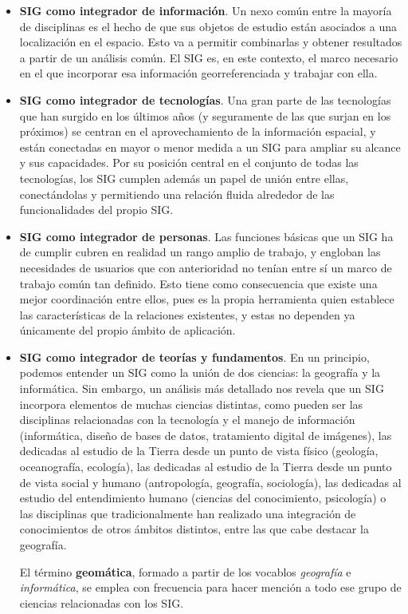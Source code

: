 \begin{itemize}
\item \textbf{SIG como integrador de información}. Un nexo común entre la mayoría de disciplinas es el hecho de que sus objetos de estudio están asociados a una localización en el espacio. Esto va a permitir combinarlas y obtener resultados a partir de un análisis común. El SIG es, en este contexto, el marco necesario en el que incorporar esa información georreferenciada y trabajar con ella.

\item \textbf{SIG como integrador de tecnologías}. Una gran parte de las tecnologías que han surgido en los últimos años (y seguramente de las que surjan en los próximos) se centran en el aprovechamiento de la información espacial, y están conectadas en mayor o menor medida a un SIG para ampliar su alcance y sus capacidades. Por su posición central en el conjunto de todas las tecnologías, los SIG cumplen además un papel de unión entre ellas, conectándolas y permitiendo una relación fluida alrededor de las funcionalidades del propio SIG.

\item \textbf{SIG como integrador de personas}. Las funciones básicas que un SIG ha de cumplir cubren en realidad un rango amplio de trabajo, y engloban las necesidades de usuarios que con anterioridad no tenían entre sí un marco de trabajo común tan definido. Esto tiene como consecuencia que existe una mejor coordinación entre ellos, pues es la propia herramienta quien establece las características de la relaciones existentes, y estas no dependen ya únicamente del propio ámbito de aplicación.

\item \textbf{SIG como integrador de teorías y fundamentos}. En un principio, podemos entender un SIG como la unión de dos ciencias: la geografía y la informática. Sin embargo, un análisis más detallado nos revela que un SIG incorpora elementos de muchas ciencias distintas, como pueden ser las disciplinas relacionadas con la tecnología y el manejo de información (informática, diseño de bases de datos, tratamiento digital de imágenes), las dedicadas al estudio de la Tierra desde un punto de vista físico (geología,  oceanografía, ecología), las dedicadas al estudio de la Tierra desde un punto de vista social y humano (antropología, geografía, sociología), las dedicadas al estudio del entendimiento humano (ciencias del conocimiento, psicología) o las disciplinas que tradicionalmente han realizado una integración de conocimientos de otros ámbitos distintos, entre las que cabe destacar la geografía.

El término \textbf{geomática}, formado a partir de los vocablos \emph{geografía} e \emph{informática}, se emplea con frecuencia para hacer mención a todo ese grupo de ciencias relacionadas con los SIG. 
\end{itemize}


